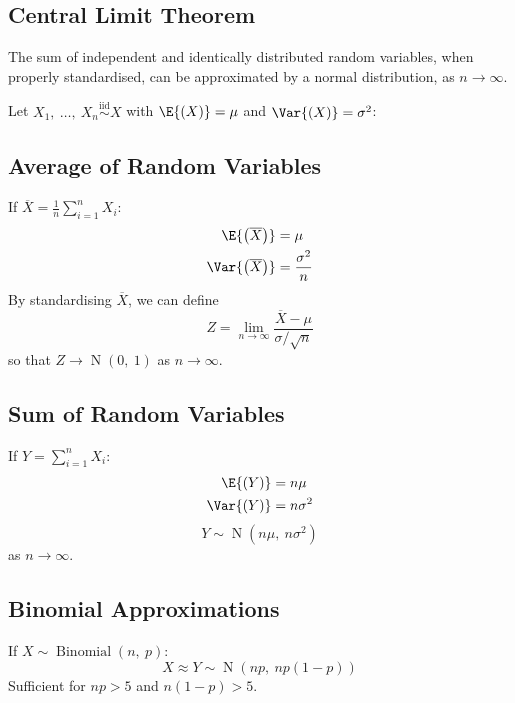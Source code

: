 \documentclass{article}
\begin{document}
\begin{minipage}{126.1962963mm}
    \begin{multicols}{2}
        \section{Central Limit Theorem}
        The sum of independent and identically distributed random variables, when properly standardised,
        can be approximated by a normal distribution, as \(n \to \infty\).

        Let \(X_1,\: \ldots,\: X_n \overset{\mathrm{iid}}{\sim} X\) with
        \(\E{\left( X \right)} = \mu\) and \(\Var{\left( X \right)} = \sigma^2\):
        \subsection{Average of Random Variables}
        If \(\overline{X} = \frac{1}{n} \sum_{i = 1}^n X_i\):
        \begin{align*}
            \E{\left( \overline{X} \right)}   & = \mu                \\
            \Var{\left( \overline{X} \right)} & = \frac{\sigma^2}{n}
        \end{align*}
        By standardising \(\overline{X}\), we can define
        \begin{equation*}
            Z = \lim_{n \to \infty} \frac{\overline{X} - \mu}{\sigma / \sqrt{n}}
        \end{equation*}
        so that \(Z \to \operatorname{N}{\left( 0,\: 1 \right)}\) as \(n \to \infty\).
        \subsection{Sum of Random Variables}
        If \(Y = \sum_{i = 1}^n X_i\):
        \begin{align*}
            \E{\left( Y \right)}   & = n \mu      \\
            \Var{\left( Y \right)} & = n \sigma^2
        \end{align*}
        \begin{equation*}
            Y \sim \operatorname{N}{\left( n \mu,\: n \sigma^2 \right)}
        \end{equation*}
        as \(n \to \infty\).
        \subsection{Binomial Approximations}
        If \(X \sim \operatorname{Binomial}{\left( n,\: p \right)}\):
        \begin{equation*}
            X \approx Y \sim \operatorname{N}{\left( np,\: np\left( 1 - p \right) \right)}
        \end{equation*}
        Sufficient for \(np > 5\) and \(n\left( 1 - p \right) > 5\).


\end{multicols}
\end{minipage}
\end{document}
